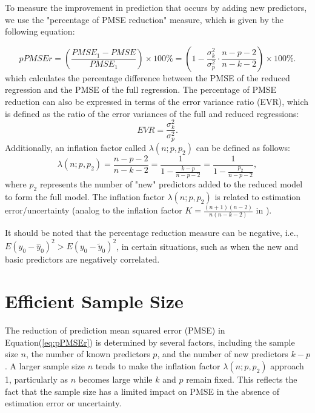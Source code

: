 To measure the improvement in prediction that occurs by adding new predictors, we use the "percentage of PMSE reduction" measure, which is given by the following equation:

\begin{equation}
\label{eq:pPMSEr}
pPMSEr = \left(\frac{PMSE_1 - PMSE}{PMSE_1} \right)\times 100\%
= \left(1 - \frac{\sigma_k^2}{\sigma_p^2} \cdot \frac{n-p-2}{n-k-2}\right)\times 100\%.
\end{equation}
which calculates the percentage difference between the PMSE of the reduced regression and the PMSE of the full regression. 
The percentage of PMSE reduction can also be expressed in terms of the error variance ratio (EVR), which is defined as the ratio of the error variances of the full and reduced regressions:
$$
EVR = \frac{\sigma_k^2}{\sigma_p^2}. 
$$
Additionally, an inflation factor called $\lambda(n;p,p_2)$ can be defined as follows:$$
\lambda(n; p, p_2) = \frac{n-p-2}{n-k-2} =  \frac{1}{1 - \frac{k-p}{n-p-2}} = \frac{1}{1 - \frac{p_2}{n-p-2}}, 
$$
where $p_2$ represents the number of "new" predictors added to the reduced model to form the full model.
The inflation factor $\lambda(n; p, p_2)$ is related to estimation error/uncertainty (analog to the inflation factor $K = \frac{(n+1)(n-2)}{n(n-k-2)}$ in \cite{sawyer1982sample}). 

It should be noted that the percentage reduction measure can be negative, i.e., $E(y_0 - \hat{y}_0)^2 > E(y_0 - \tilde{y}_0)^2$, in certain situations, such as when the new and basic predictors are negatively correlated.



\section{Efficient Sample Size}

The reduction of prediction mean squared error (PMSE) in Equation(\ref{eq:pPMSEr}) is determined by several factors, including the sample size $n$, the number of known predictors $p$, and the number of new predictors $k-p$. A larger sample size $n$ tends to make the inflation factor $\lambda(n;p,p_2)$ approach 1, particularly as $n$ becomes large while $k$ and $p$ remain fixed. This reflects the fact that the sample size has a limited impact on PMSE in the absence of estimation error or uncertainty.

